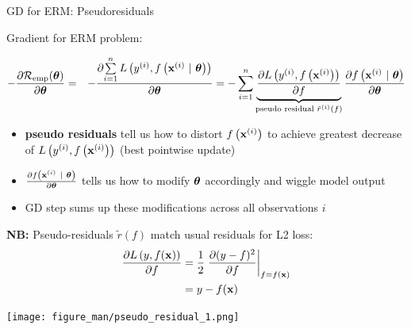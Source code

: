 \documentclass[11pt,compress,t,notes=noshow, xcolor=table]{beamer}
\begin{document}
\begin{vbframe}{GD for ERM: Pseudoresiduals}

\begin{footnotesize}

Gradient for ERM problem: 

\vspace*{-0.5cm}

\begin{eqnarray*}
- \frac{\partial{\mathcal{R}_{\text{emp}}(\bm{\theta})}}{\partial \bm{\theta}} &=& - \frac{\partial{\sum\limits_{i=1}^nL\left(y^{(i)}, f\left(\mathbf{x}^{(i)} ~|~ \bm{\theta}\right)\right)}}{\partial \bm{\theta}}= - \sum\limits_{i=1}^n \underbrace{\frac{\partial{L\left(y^{(i)}, f\left(\mathbf{x}^{(i)}\right)\right)}}{\partial f}}_{\text{pseudo residual } \tilde r^{(i)}(f)} \frac{\partial{f\left(\mathbf{x}^{(i)} ~|~ \bm{\theta}\right)}}{\partial \bm{\theta}}
\end{eqnarray*}

\vspace*{-0.5cm}

\begin{itemize}
	\item \textbf{pseudo residuals} tell us how to distort $f\left(\mathbf{x}^{(i)}\right)$ to achieve greatest decrease of $L\left(y^{(i)}, f\left(\mathbf{x}^{(i)}\right)\right)$ (best pointwise update)
	\item $\frac{\partial{f\left(\mathbf{x}^{(i)} ~|~ \bm{\theta}\right)}}{\partial \bm{\theta}}$ tells us how to modify $\bm{\theta}$ accordingly and wiggle model output
	\item GD step sums up these modifications across all observations $i$
\end{itemize}

\begin{minipage}[b]{0.45\textwidth}
  \textbf{NB:} Pseudo-residuals 
  $\tilde{r}\left( f \right)$ 
  match usual residuals for L2 loss:
  \begin{align*}
  \frac{\partial{L\left(y, f(\mathbf{x})\right)}}{\partial f} & = \frac{1}{2} \left. \frac{\partial{(y - f)^2}}{\partial f} \right|_{f = f(\mathbf{x})}\\ 
                   & = y - f(\mathbf{x})
  \end{align*}
\end{minipage}%
\begin{minipage}[b]{0.05\textwidth}
   \phantom{foo}
\end{minipage}
\begin{minipage}[b]{0.45\textwidth}
  \texttt{[image: figure\_man/pseudo\_residual\_1.png]}
\end{minipage}

\end{footnotesize}


\end{vbframe}


\endlecture
\end{document}
